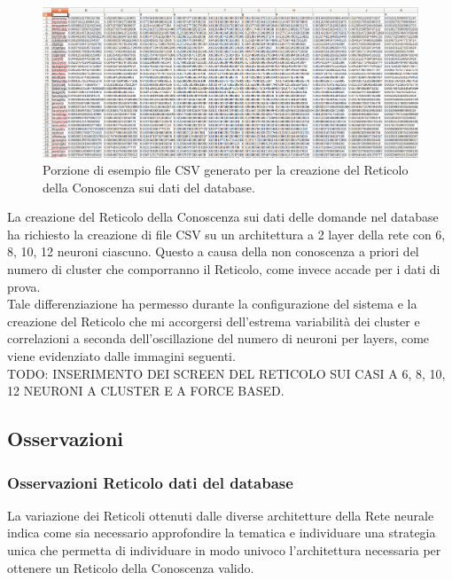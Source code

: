 \noindent
\begin{figure}[H]
\centering
	\includegraphics[width=1\linewidth]{./image/fileCSV_rete-db-10neuroni.png}
	\caption{Porzione di esempio file CSV generato per la creazione del Reticolo della Conoscenza sui dati del database.}
	\label{Porzione di esempio file CSV generato per la creazione del Reticolo della Conoscenza sui dati del database.}
\end{figure}
\noindent
La creazione del Reticolo della Conoscenza sui dati delle domande nel database ha richiesto la creazione di file CSV su un architettura a 2 layer della rete con 6, 8, 10, 12 neuroni ciascuno. Questo a causa della non conoscenza a priori del numero di cluster che comporranno il Reticolo, come invece accade per i dati di prova.\\
Tale differenziazione ha permesso durante la configurazione del sistema e la creazione del Reticolo che mi accorgersi dell'estrema variabilit\`a dei cluster e correlazioni a seconda dell'oscillazione del numero di neuroni per layers, come viene evidenziato dalle immagini seguenti.\\

TODO: INSERIMENTO DEI SCREEN DEL RETICOLO SUI CASI A 6, 8, 10, 12 NEURONI A CLUSTER E A FORCE BASED.

\subsection{Osservazioni}
\subsubsection{Osservazioni Reticolo dati del database}
La variazione dei Reticoli ottenuti dalle diverse architetture della Rete neurale indica come sia necessario approfondire la tematica e individuare una strategia unica che permetta di individuare in modo univoco l'architettura necessaria per ottenere un Reticolo della Conoscenza valido.



